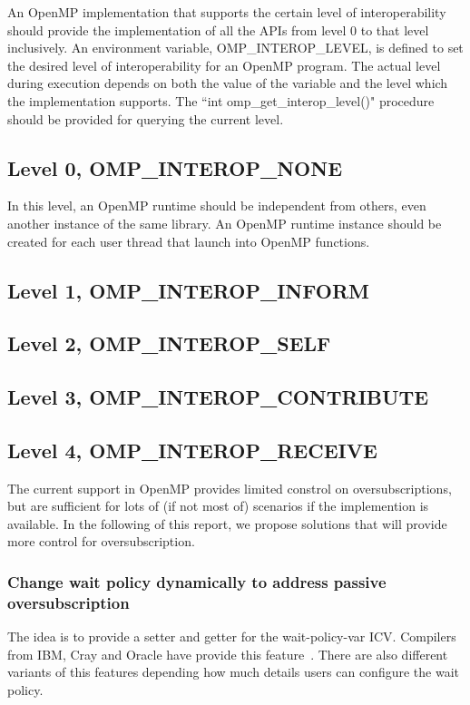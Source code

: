 An OpenMP implementation that supports the certain level of interoperability should provide the implementation of all the APIs
from level 0 to that level inclusively. 
An environment variable, {\sf OMP\_INTEROP\_LEVEL}, is defined to set the desired level of 
interoperability for an OpenMP program. The actual level during execution depends on both the value of 
the variable and the level which the implementation supports. 
The ``{\sf int omp\_get\_interop\_level()}" procedure should be provided for querying the current level. %

\subsection{Level 0, OMP\_INTEROP\_NONE}
In this level, an OpenMP runtime should be independent from others, even another instance of the same library. 
An OpenMP runtime instance should be created for each user thread that launch 
into OpenMP functions. 
\subsection{Level 1, OMP\_INTEROP\_INFORM} 
\subsection{Level 2, OMP\_INTEROP\_SELF} 
\subsection{Level 3, OMP\_INTEROP\_CONTRIBUTE} 
\subsection{Level 4, OMP\_INTEROP\_RECEIVE} 

The current support in OpenMP provides limited constrol on oversubscriptions, but are sufficient 
for lots of (if not most of) scenarios if the implemention is available. In the following of this
report, we propose solutions that will provide more
control for oversubscription.
\subsubsection{Change wait policy dynamically to address passive oversubscription}
The idea is to provide a setter and getter for the wait-policy-var
ICV. Compilers from IBM, Cray and Oracle have provide this feature~\cite{ibmwait,craywait,oraclewait}.
There are also different variants of this features depending how much details users can configure
the wait policy.
